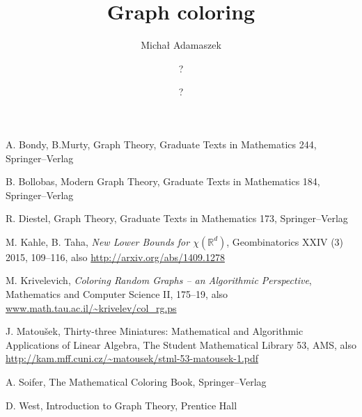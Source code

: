 \documentclass[a4paper,oneside]{report}
\title{\bf Graph coloring}
\author{Micha{\l} Adamaszek \and ? \and ?}
\theoremstyle{plain}
\theoremstyle{myremark}
\newcommand{\real}{\mathbb{R}}
\begin{document}
\maketitle
\tableofcontents













\begin{thebibliography}{99}
 A. Bondy, B.Murty, Graph Theory, Graduate Texts in Mathematics 244, Springer--Verlag  

 B. Bollobas, Modern Graph Theory, Graduate Texts in Mathematics 184, Springer--Verlag

 R. Diestel, Graph Theory, Graduate Texts in Mathematics 173, Springer--Verlag  

 M. Kahle, B. Taha, \textit{New Lower Bounds for $\chi(\real^d)$}, Geombinatorics XXIV (3) 2015, 109--116, also \url{http://arxiv.org/abs/1409.1278}

 M. Krivelevich, \textit{Coloring Random Graphs -- an Algorithmic Perspective}, Mathematics and Computer Science II, 175--19, also \url{www.math.tau.ac.il/~krivelev/col_rg.ps}

 J. Matou\v{s}ek, Thirty-three Miniatures: Mathematical and Algorithmic Applications of Linear Algebra, The Student Mathematical Library 53, AMS, also \url{http://kam.mff.cuni.cz/~matousek/stml-53-matousek-1.pdf} 

 A. Soifer, The Mathematical Coloring Book, Springer--Verlag

 D. West, Introduction to Graph Theory, Prentice Hall

\end{thebibliography}
\end{document}
